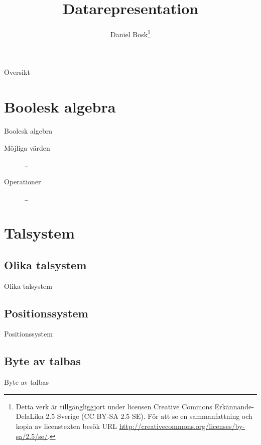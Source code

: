 \documentclass{beamer}
\title[Introduktion]{%
	Datarepresentation
}
\author{Daniel Bosk\footnote{%
	\tiny
	Detta verk är tillgängliggjort under licensen Creative Commons 
	Erkännande-DelaLika 2.5 Sverige (CC BY-SA 2.5 SE).
	För att se en sammanfattning och kopia av licenstexten besök URL 
	\url{http://creativecommons.org/licenses/by-sa/2.5/se/}.
}}
\institute[MIUN ITM]{%
	Institutionen för informationsteknologi och medier (ITM),\\
	Mittuniversitetet, Sundsvall.
}
\date{\svnId}
\begin{document}
\begin{frame}
  \titlepage
\end{frame}

\begin{frame}{Översikt}
	\tableofcontents
\end{frame}





\section{Boolesk algebra}

\begin{frame}{Boolesk algebra}
	\begin{description}
		\item[Möjliga värden] \dots
		\item[Operationer] \dots
	\end{description}
\end{frame}


\section{Talsystem}

\subsection{Olika talsystem}
\begin{frame}{Olika talsystem}
\end{frame}

\subsection{Positionssystem}
\begin{frame}{Positionssystem}
\end{frame}

\subsection{Byte av talbas}
\begin{frame}{Byte av talbas}
\end{frame}
\end{document}
